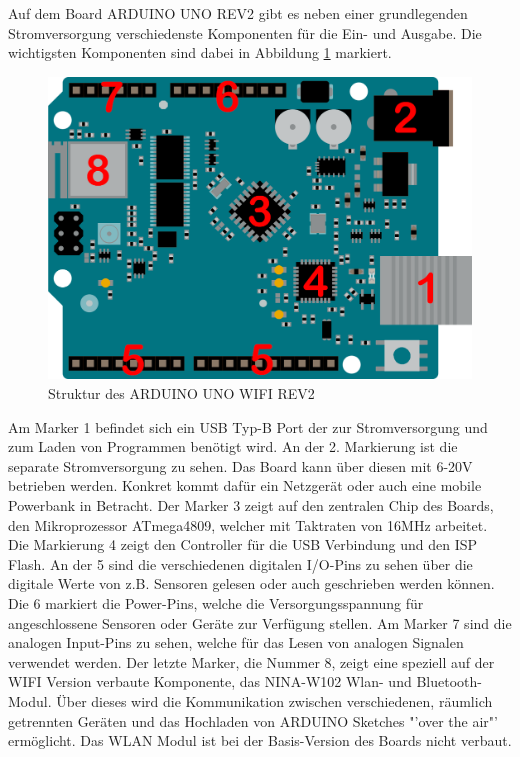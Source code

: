 \documentclass[
    load-dhbw-templates,
    load-preamble = true,
    auto-intro-pages = all,
    add-tocs-to-toc,
    debug = true,
    language = english,
    mainlanguage = ngerman,
    add-bibliography,
    bib-file = dhbw-source.bib,
    biblatex/style = alphabetic, 
]{iodhbwm}
\begin{document}
        Auf dem Board ARDUINO UNO REV2 gibt es neben einer grundlegenden Stromversorgung verschiedenste Komponenten für die Ein- und Ausgabe. Die wichtigsten Komponenten sind dabei in Abbildung \ref{fig:ARDUINOUNOSketch} markiert.

        \begin{figure}[H]
            \centering
            \includegraphics[scale=0.25]{../Quellenangaben/Dokumente/ARDUINO UNO REV2 Dokumentation/unorev2_edited.png}
            \caption[ARDUINOUNOSketch]{Struktur des ARDUINO UNO WIFI REV2 \footnotemark}
            \label{fig:ARDUINOUNOSketch} 
        \end{figure}
            
            
        Am Marker 1 befindet sich ein USB Typ-B Port der zur Stromversorgung und zum Laden von Programmen benötigt wird.
        An der 2. Markierung ist die separate Stromversorgung zu sehen. Das Board kann über diesen mit 6-20V betrieben werden. Konkret kommt dafür ein Netzgerät oder auch eine mobile Powerbank in Betracht.
        Der Marker 3 zeigt auf den zentralen Chip des Boards, den Mikroprozessor ATmega4809, welcher mit Taktraten von 16MHz arbeitet.
        Die Markierung 4 zeigt den Controller für die USB Verbindung und den ISP Flash.
        An der 5 sind die verschiedenen digitalen I/O-Pins zu sehen über die digitale Werte von z.B. Sensoren gelesen oder auch geschrieben werden können.
        Die 6 markiert die Power-Pins, welche die Versorgungsspannung für angeschlossene Sensoren oder Geräte zur Verfügung stellen.
        Am Marker 7 sind die analogen Input-Pins zu sehen, welche für das Lesen von analogen Signalen verwendet werden.
        Der letzte Marker, die Nummer 8, zeigt eine speziell auf der WIFI Version verbaute Komponente, das NINA-W102 Wlan- und Bluetooth-Modul. Über dieses wird die Kommunikation zwischen verschiedenen, räumlich getrennten Geräten und das Hochladen von ARDUINO Sketches "'over the air"' ermöglicht.
        Das WLAN Modul ist bei der Basis-Version des Boards nicht verbaut.
\end{document}
